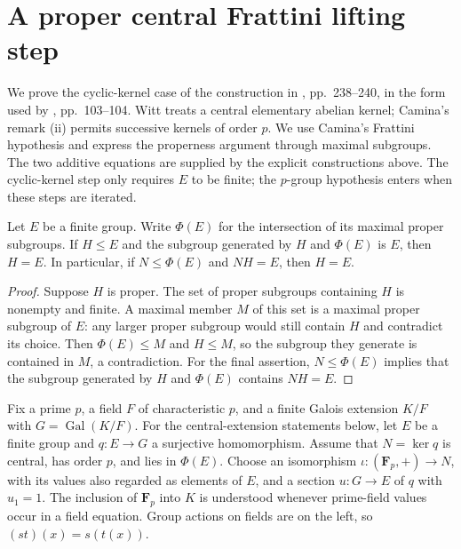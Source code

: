 \section{A proper central Frattini lifting step}

We prove the cyclic-kernel case of the construction in
\cite{Witt1936}, pp.~238--240, in the form used by
\cite{Camina1997}, pp.~103--104. Witt treats a central elementary
abelian kernel; Camina's remark (ii) permits successive kernels of
order $p$. We use Camina's Frattini hypothesis and express the
properness argument through maximal subgroups. The two additive
equations are supplied by the explicit constructions above. The cyclic-kernel
step only requires $E$ to be finite; the $p$-group hypothesis enters
when these steps are iterated.

\begin{lemma}
\label{lem:frattini-no-proper-supplement}
\mathlibok
Let $E$ be a finite group. Write $\Phi(E)$ for the intersection
of its maximal proper subgroups. If $H\le E$ and the subgroup
generated by $H$ and $\Phi(E)$ is $E$, then $H=E$.
In particular, if $N\le\Phi(E)$ and $NH=E$, then $H=E$.
\end{lemma}

\begin{proof}
Suppose $H$ is proper. The set of proper subgroups containing
$H$ is nonempty and finite. A maximal member $M$ of this set
is a maximal proper subgroup of $E$: any larger proper subgroup
would still contain $H$ and contradict its choice.
Then $\Phi(E)\le M$ and $H\le M$, so the subgroup they
generate is contained in $M$, a contradiction. For the final
assertion, $N\le\Phi(E)$ implies that the subgroup generated
by $H$ and $\Phi(E)$ contains $NH=E$.
\end{proof}

Fix a prime $p$, a field $F$ of characteristic $p$, and a finite
Galois extension $K/F$ with $G=\operatorname{Gal}(K/F)$.
For the central-extension statements below, let $E$ be a finite group and
$q:E\to G$ a surjective homomorphism. Assume that
$N=\ker q$ is central, has order $p$, and lies in $\Phi(E)$.
Choose an isomorphism $\iota:(\mathbf F_p,+)\to N$, with
its values also regarded as elements of $E$, and a section
$u:G\to E$ of $q$ with $u_1=1$.
The inclusion of $\mathbf F_p$ into $K$ is understood whenever
prime-field values occur in a field equation. Group actions on
fields are on the left, so $(st)(x)=s(t(x))$.

